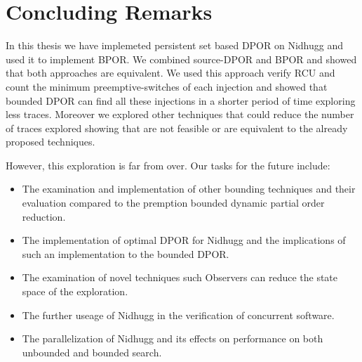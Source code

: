 \chapter{Concluding Remarks}
\label{Chapter 6}

In this thesis we have implemeted persistent set based DPOR on Nidhugg and used it to implement BPOR.
We combined source-DPOR and BPOR and showed that both approaches are equivalent. We used this approach 
verify RCU and count the minimum preemptive-switches of each injection and showed that bounded DPOR can
find all these injections in a shorter period of time exploring less traces. Moreover we explored other
techniques that could reduce the number of traces explored showing that are not feasible or are equivalent
to the already proposed techniques.

However, this exploration is far from over. Our tasks for the future include:

\begin{itemize}
    \item The examination and implementation of other bounding techniques and their evaluation compared to the premption bounded dynamic
    partial order reduction.
    \item The implementation of optimal DPOR for Nidhugg and the implications of such an implementation to the bounded DPOR.
    \item The examination of novel techniques such Observers can reduce the state space of the exploration.
    \item The further useage of Nidhugg in the verification of concurrent software.
    \item The parallelization of Nidhugg and its effects on performance on both unbounded and bounded search.
\end{itemize}